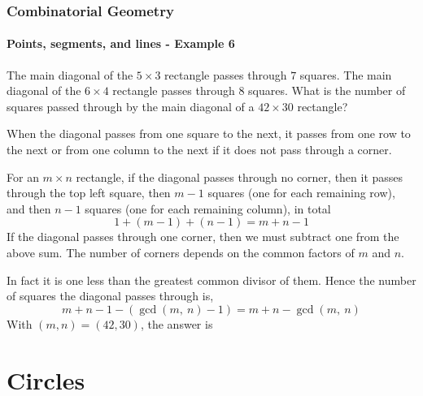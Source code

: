 \documentclass[8pt,xcolor=table,dvipsnames]{beamer}
\begin{document}
\begin{frame}[t]
    \frametitle{Combinatorial Geometry}
    \framesubtitle{Points, segments, and lines - Example 6}
    \begin{example}
        The main diagonal of the $5 \times 3$ rectangle passes through $7$ squares.
        The main diagonal of the $6 \times 4$ rectangle passes through $8$ squares.
       What is the number of squares passed through by the main diagonal of a $42 \times 30$ rectangle?
    \end{example}
    When the diagonal passes from one square to the next,
    it passes from one row to the next or from one column to the next if it does not pass through a corner.

    For an $m \times n$ rectangle, if the diagonal passes through no corner, then it passes through the top left square,
    then $m-1$ squares (one for each remaining row), and then $n-1$ squares (one for each remaining column), in total
    \[
        1+(m-1)+(n-1)=m+n-1
    \]
    If the diagonal passes through one corner, then we must subtract one from the above sum.
    The number of corners depends on the common factors of $m$ and $n$.
    
    In fact it is one less than the greatest common divisor of them. Hence the number of squares the diagonal passes through is,
    \[
        m+n-1-(\gcd(m,\ n)-1)=m+n-\gcd(m,\ n)
    \]
    With $(m,n)=(42,30)$, the answer is 
\end{frame}

\section{Circles}
\end{document}
